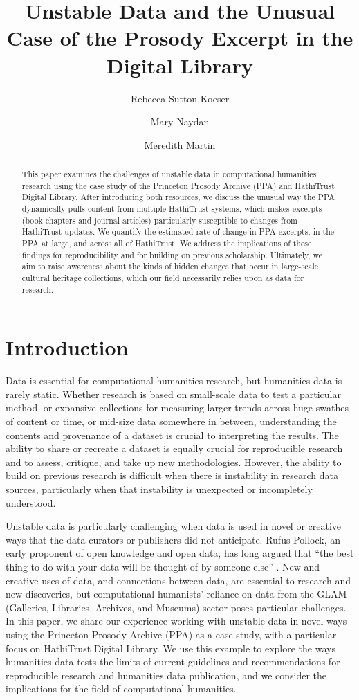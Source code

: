 \documentclass{anthology-ch}         %
\title{Unstable Data and the Unusual Case of the Prosody Excerpt in the Digital Library}
\author[1]{Rebecca Sutton Koeser}[
  orcid=0000-0002-8762-8057
]
\author[1]{Mary Naydan}[
  orcid=0000-0002-7960-3175
]
\author[1]{Meredith Martin}[
  orcid=0000-0003-0214-8757
]
\affiliation{1}{Center for Digital Humanities, Princeton University, Princeton, New Jersey, USA}
\begin{document}
\maketitle

\begin{abstract}
This paper examines the challenges of unstable data in computational humanities research using the case study of the Princeton Prosody Archive (PPA) and HathiTrust Digital Library. After introducing both resources, we discuss the unusual way the PPA dynamically pulls content from multiple HathiTrust systems, which makes excerpts (book chapters and journal articles) particularly susceptible to changes from HathiTrust updates. We quantify the estimated rate of change in PPA excerpts, in the PPA at large, and across all of HathiTrust. We address the implications of these findings for reproducibility and for building on previous scholarship. Ultimately, we aim to raise awareness about the kinds of hidden changes that occur in large-scale cultural heritage collections, which our field necessarily relies upon as data for research.  
\end{abstract}

\section{Introduction}

Data is essential for computational humanities research, but humanities data is rarely static. Whether research is based on small-scale data to test a particular method, or expansive collections for measuring larger trends across huge swathes of content or time, or mid-size data somewhere in between, understanding the contents and provenance of a dataset is crucial to interpreting the results. The ability to share or recreate a dataset is equally crucial for reproducible research and to assess, critique, and take up new methodologies. However, the ability to build on previous research is difficult when there is instability in research data sources, particularly when that instability is unexpected or incompletely understood. 

Unstable data is particularly challenging when data is used in novel or creative ways that the data curators or publishers did not anticipate. Rufus Pollock, an early proponent of open knowledge and open data, has long argued that “the best thing to do with your data will be thought of by someone else”  \cite{pollock_open_2011}. New and creative uses of data, and connections between data, are essential to research and new discoveries, but computational humanists’ reliance on data from the GLAM (Galleries, Libraries, Archives, and Museums) sector poses particular challenges. In this paper, we share our experience working with unstable data in novel ways using the Princeton Prosody Archive (PPA) as a case study, with a particular focus on HathiTrust Digital Library. We use this example to explore the ways humanities data tests the limits of current guidelines and recommendations for reproducible research and humanities data publication, and we consider the implications for the field of computational humanities. 
\end{document}
